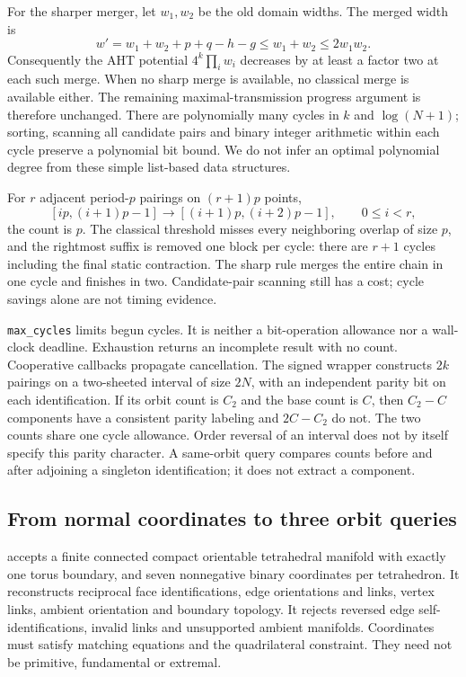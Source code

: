 For the sharper merger, let $w_1,w_2$ be the old domain widths. The merged
width is
\[
 w'=w_1+w_2+p+q-h-g\le w_1+w_2\le 2w_1w_2.
\]
Consequently the AHT potential $4^k\prod_i w_i$ decreases by at least a
factor two at each such merge. When no sharp merge is available, no
classical merge is available either. The remaining maximal-transmission
progress argument is therefore unchanged. There are polynomially many
cycles in $k$ and $\log(N+1)$; sorting, scanning all candidate pairs and
binary integer arithmetic within each cycle preserve a polynomial bit
bound. We do not infer an optimal polynomial degree from these simple
list-based data structures.

For $r$ adjacent period-$p$ pairings on $(r+1)p$ points,
\[
 [ip,(i+1)p-1]\longrightarrow[(i+1)p,(i+2)p-1],\qquad 0\le i<r,
\]
the count is $p$. The classical threshold misses every neighboring overlap
of size $p$, and the rightmost suffix is removed one block per cycle: there
are $r+1$ cycles including the final static contraction. The sharp rule
merges the entire chain in one cycle and finishes in two. Candidate-pair
scanning still has a cost; cycle savings alone are not timing evidence.

\texttt{max\_cycles} limits begun cycles. It is neither a bit-operation
allowance nor a wall-clock deadline. Exhaustion returns an incomplete
result with no count. Cooperative callbacks propagate cancellation. The
signed wrapper constructs $2k$ pairings on a two-sheeted interval of size
$2N$, with an independent parity bit on each identification. If its orbit
count is $C_2$ and the base count is $C$, then $C_2-C$ components have a
consistent parity labeling and $2C-C_2$ do not. The two counts share one
cycle allowance. Order reversal of an interval does not by itself specify
this parity character. A same-orbit query compares counts before and after
adjoining a singleton identification; it does not extract a component.

\subsection{From normal coordinates to three orbit queries}

 accepts a finite connected
compact orientable tetrahedral manifold with exactly one torus boundary,
and seven nonnegative binary coordinates per tetrahedron. It reconstructs
reciprocal face identifications, edge orientations and links, vertex links,
ambient orientation and boundary topology. It rejects reversed edge
self-identifications, invalid links and unsupported ambient manifolds.
Coordinates must satisfy matching equations and the quadrilateral
constraint. They need not be primitive, fundamental or extremal.


